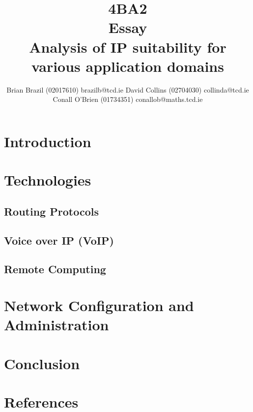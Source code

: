\documentclass[a4paper,12pt]{article}
\begin{document}
\title{4BA2 \\ Essay \\ Analysis of IP suitability for various application domains}

\author{Brian Brazil (02017610) brazilb@tcd.ie
David Collins (02704030) collinda@tcd.ie \\ 
Conall O'Brien (01734351) conallob@maths.tcd.ie}

\maketitle

\section{Introduction}

\section{Technologies}

\subsection{Routing Protocols}


\subsection{Voice over IP (VoIP)}


\subsection{Remote Computing}


\section{Network Configuration and Administration}


\section{Conclusion}


\section{References}
\end{document}
